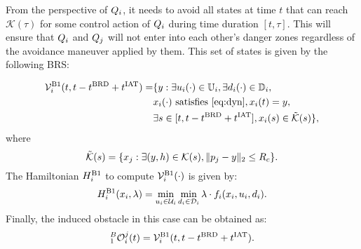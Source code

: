 \begin{itemize}[leftmargin=*]
From the perspective of $Q_i$, it needs to avoid all states at time $t$ that can reach $\mathcal{K}(\tau)$ for some control action of $Q_i$ during time duration $[t, \tau]$. This will ensure that $Q_i$ and $Q_j$ will not enter into each other's danger zones regardless of the avoidance maneuver applied by them. This set of states is given by the following BRS:

\begin{equation}  \label{eq:ObsBRS_case1_caseB}
\begin{aligned}
\brs^{\text{B1}}_{i}(t, t-\brd+\iat) = & \{y: \exists \ctrl_i(\cdot) \in \cfset_i, \exists \dstb_i(\cdot) \in \dfset_i, \\
& \state_i(\cdot) \text{ satisfies \eqref{eq:dyn}}, \state_i(t) = y, \\
& \exists s \in [t, t-\brd+\iat], \state_i(s) \in \tilde{\mathcal{K}}(s)\},
\end{aligned}
\end{equation}
where
\begin{equation*}
\tilde{\mathcal{K}}(s) = \{x_j: \exists (y, h) \in \mathcal{K}(s), \|p_j - y\|_2 \le R_c \}.
\end{equation*} 
The Hamiltonian $H^{\text{B1}}_{i}$ to compute $\mathcal{V}^{\text{B1}}_{i}(\cdot)$ is given by:
\begin{equation} \label{eqn:BRS_obsham_case1_caseB}
\ham^{\text{B1}}_{i}(\state_i, \costate) = \min_{\ctrl_i \in \cset_i} \min_{\dstb_i \in \dset_i} \costate \cdot f_i (\state_i, \ctrl_i, \dstb_i).
\end{equation}
Finally, the induced obstacle in this case can be obtained as:
\begin{equation} \label{eq:intruderObs_case1_caseB} 
_1^B\ioset_i^j(t) = \brs^{\text{B1}}_{i}(t, t-\brd+\iat).
\end{equation}
\end{itemize}